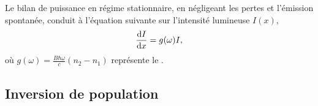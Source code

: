 \documentclass[12pt,fancy]{cours}
\begin{document}
%
\begin{theorem}\label{form:}
  Le bilan de puissance en régime stationnaire, en négligeant les pertes et l'émission spontanée, conduit à l'équation suivante sur l'intensité lumineuse $I(x)$,
\begin{equation*}
\frac{\mathrm{d} I}{\mathrm{d} x}=g(\omega)I,
\end{equation*}
où $g(\omega)=\frac{B\hbar\omega}{c}(n_2-n_1)$ représente le .
\end{theorem}

\subsection{Inversion de population}
\end{document}

